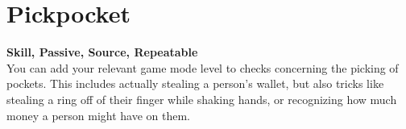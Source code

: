 \section{Pickpocket}\label{sec:pickpocket}
\textbf{Skill, Passive, Source, Repeatable}\\
You can add your relevant game mode level to checks concerning the picking of pockets.
This includes actually stealing a person's wallet, but also tricks like stealing a ring off of their finger while shaking hands, or recognizing  how much money a person might have on them.